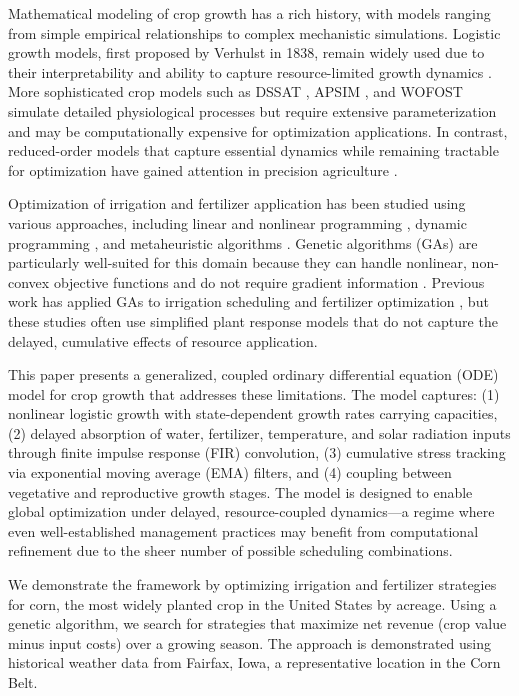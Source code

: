 \documentclass[preprint,12pt]{elsarticle}
\begin{document}
Mathematical modeling of crop growth has a rich history, with models ranging from simple empirical relationships to complex mechanistic simulations. Logistic growth models, first proposed by Verhulst in 1838, remain widely used due to their interpretability and ability to capture resource-limited growth dynamics \cite{verhulst1838}. More sophisticated crop models such as DSSAT \cite{jones2003dssat}, APSIM \cite{holzworth2014apsim}, and WOFOST \cite{wofost} simulate detailed physiological processes but require extensive parameterization and may be computationally expensive for optimization applications. In contrast, reduced-order models that capture essential dynamics while remaining tractable for optimization have gained attention in precision agriculture \cite{precision-ag-review}.

Optimization of irrigation and fertilizer application has been studied using various approaches, including linear and nonlinear programming \cite{irrigation-optimization}, dynamic programming \cite{dp-irrigation}, and metaheuristic algorithms \cite{ga-agriculture}. Genetic algorithms (GAs) are particularly well-suited for this domain because they can handle nonlinear, non-convex objective functions and do not require gradient information \cite{goldberg1989ga}. Previous work has applied GAs to irrigation scheduling \cite{ga-irrigation-scheduling} and fertilizer optimization \cite{ga-fertilizer}, but these studies often use simplified plant response models that do not capture the delayed, cumulative effects of resource application.

This paper presents a generalized, coupled ordinary differential equation (ODE) model for crop growth that addresses these limitations. The model captures: (1) nonlinear logistic growth with state-dependent growth rates carrying capacities, (2) delayed absorption of water, fertilizer, temperature, and solar radiation inputs through finite impulse response (FIR) convolution, (3) cumulative stress tracking via exponential moving average (EMA) filters, and (4) coupling between vegetative and reproductive growth stages. The model is designed to enable global optimization under delayed, resource-coupled dynamics---a regime where even well-established management practices may benefit from computational refinement due to the sheer number of possible scheduling combinations.

We demonstrate the framework by optimizing irrigation and fertilizer strategies for corn, the most widely planted crop in the United States by acreage. Using a genetic algorithm, we search for strategies that maximize net revenue (crop value minus input costs) over a growing season. The approach is demonstrated using historical weather data from Fairfax, Iowa, a representative location in the Corn Belt.
\end{document}
